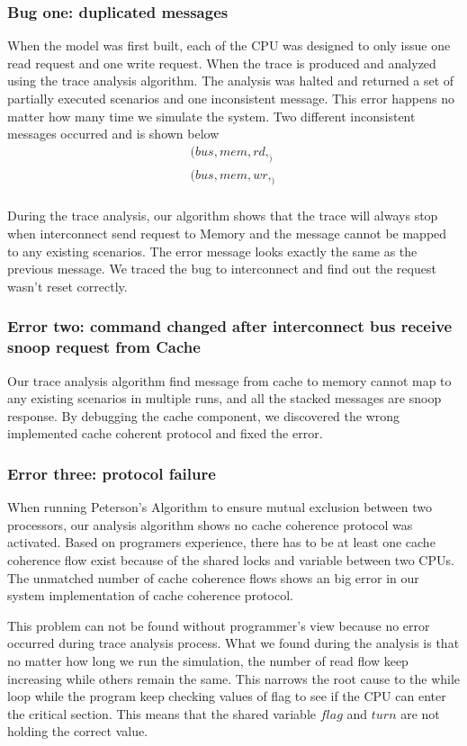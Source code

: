 \documentclass[12pt,frontmatter,copyright,thesis]{usfmanus}
\begin{document}
\subsubsection{Bug one: duplicated messages}
When the model was first built, each of the CPU was designed to only issue one
read request and one write request. When the trace is produced and analyzed using
the trace analysis algorithm. The analysis was halted and returned a set of partially
executed scenarios and one inconsistent message. This error happens no matter
how many time we simulate the system.
Two different inconsistent messages occurred and is shown below
\[
\begin{array}{|}
(bus, mem, rd, _)\\
(bus, mem, wr, _)\\
\end{array}
\] 


During the trace analysis, our algorithm shows that the trace will always stop when interconnect send
 request to Memory and the message cannot be mapped to any existing scenarios. The error message
 looks exactly the same as the previous message. We traced the bug to interconnect and find out the request
 wasn't reset correctly.

\subsubsection{Error two: command changed after interconnect bus receive snoop request from Cache}

Our trace analysis algorithm find message from cache to memory cannot map to any existing scenarios in 
multiple runs, and all the stacked messages are snoop response. By debugging the cache component,
we discovered the wrong implemented cache coherent protocol and fixed the error.
\subsubsection{Error three: protocol failure}


When running Peterson's Algorithm to ensure mutual exclusion between two processors, our analysis algorithm 
shows no cache coherence protocol was activated. Based on programers experience, there has to be at least one cache 
coherence flow exist because of the shared locks and variable between two CPUs. 
The unmatched number of cache coherence flows shows an big error in our system implementation
of cache coherence protocol. 

This problem can not be found without programmer's view because no error occurred during trace analysis process.
What we found during the analysis is that no matter how long we run the simulation, the number of read flow keep increasing while
others remain the same. This narrows the root cause to the while loop while the program keep checking values of flag to see
if the CPU can enter the critical section. This means that the
shared variable $flag$ and $turn$ are not holding the correct value.
\end{document}
